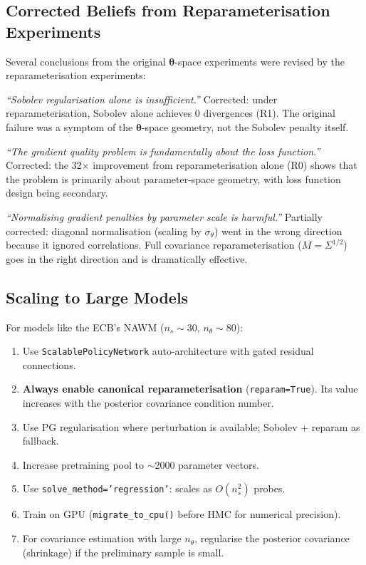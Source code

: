 \documentclass[11pt,a4paper]{article}
\theoremstyle{definition}
\newcommand{\btheta}{\boldsymbol{\theta}}
\newcommand{\code}[1]{\texttt{\color{codecolor}#1}}
\begin{document}
	\subsection{Corrected Beliefs from Reparameterisation Experiments}
	
	Several conclusions from the original $\btheta$-space experiments were revised by the reparameterisation experiments:
	
	\emph{``Sobolev regularisation alone is insufficient.''}
	Corrected: under reparameterisation, Sobolev alone achieves 0 divergences (R1).
	The original failure was a symptom of the $\btheta$-space geometry, not the Sobolev penalty itself.
	
	\emph{``The gradient quality problem is fundamentally about the loss function.''}
	Corrected: the 32$\times$ improvement from reparameterisation alone (R0) shows that the problem is primarily about parameter-space geometry, with loss function design being secondary.
	
	\emph{``Normalising gradient penalties by parameter scale is harmful.''}
	Partially corrected: diagonal normalisation (scaling by $\sigma_\theta$) went in the wrong direction because it ignored correlations.
	Full covariance reparameterisation ($M = \Sigma^{1/2}$) goes in the right direction and is dramatically effective.
	
	\subsection{Scaling to Large Models}
	
	For models like the ECB's NAWM ($n_s \sim 30$, $n_\theta \sim 80$):
	\begin{enumerate}[nosep]
		\item Use \code{ScalablePolicyNetwork} auto-architecture with gated residual connections.
		\item \textbf{Always enable canonical reparameterisation} (\code{reparam=True}).
		Its value increases with the posterior covariance condition number.
		\item Use PG regularisation where perturbation is available; Sobolev + reparam as fallback.
		\item Increase pretraining pool to $\sim$2000 parameter vectors.
		\item Use \code{solve\_method='regression'}: scales as $O(n_s^2)$ probes.
		\item Train on GPU (\code{migrate\_to\_cpu()} before HMC for numerical precision).
		\item For covariance estimation with large $n_\theta$, regularise the posterior covariance (shrinkage) if the preliminary sample is small.
	\end{enumerate}
	
\end{document}
